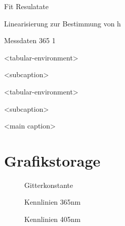 \documentclass[11pt, a4paper]{article}
\numberwithin{equation}{section}
\begin{document}
\begin{table}[h]
	\centering
	
	\caption{Fit Resulatate}
	\label{tab:photoeffekt_fit_results}
\end{table}
\begin{table}[h]
	\centering
	
	\caption{Linearisierung zur Bestimmung von h}
	\label{tab:photoeffekt_planck_fitdaten}
\end{table}

\begin{table}[h]
	\centering
	
	\caption{Messdaten 365 1}
	\label{tab:365nm_1}
\end{table}

\clearpage

\begin{table}
\centering
\begin{subtable}{0.5\textwidth}
\centering

<tabular-environment>

\caption{<subcaption>}
\end{subtable}%
\begin{subtable}{0.5\textwidth}
\centering

<tabular-environment>

\caption{<subcaption>}
\end{subtable}

\caption{<main caption>}
\end{table}

\section{Grafikstorage}

\begin{figure}
\centering

\caption{Gitterkonstante}
\label{fig:gitterkonstante}
\end{figure}

\clearpage

\begin{figure}
	\centering
	
	\caption{Kennlinien 365nm}
	\label{fig:kennlinien_365nm}
\end{figure}

\begin{figure}
	\centering
	
	\caption{Kennlinien 405nm}
	\label{fig:kennlinien_405nm}
\end{figure}
\end{document}
